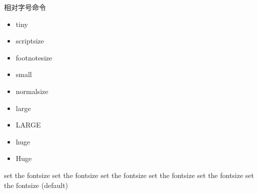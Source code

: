\documentclass[twoside]{ctexart} %
\begin{document}


           
            相对字号命令
            \begin{itemize}
                \item \tiny tiny 
                \item \scriptsize scriptsize
                \item \footnotesize footnotesize
                \item \small small
                \item \normalsize normalsize %
                \item \large large
                \item \LARGE LARGE
                \item \huge huge
                \item \Huge Huge
            \end{itemize}

            set the fontsize set the fontsize set the fontsize set the fontsize set the fontsize set the fontsize (default)
\end{document}
